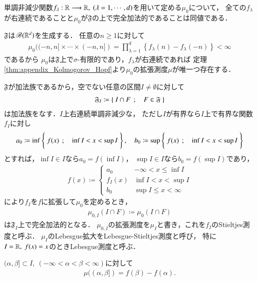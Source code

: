 	\begin{screen}
		\begin{thm}[右連続性と完全加法性]
			単調非減少関数$f_\lambda:\R \longrightarrow \R,\ (\lambda=1,\cdots,d)$を用いて定める$\mu_0$について，
			全ての$f_\lambda$が右連続であることと$\mu_0$が$\mathfrak{F}$の上で完全加法的であることは同値である．
		\end{thm}
	\end{screen}
	
	$\mathfrak{F}$は$\mathscr{B}(\mathbb{R}^d)$を生成する．
	任意の$n \geq 1$に対して
	\begin{align}
		\mu_0((-n,n] \times \cdots \times (-n,n]) 
		= \prod_{\lambda=1}^d \left\{f_\lambda(n) - f_\lambda(-n)\right\} < \infty
	\end{align}
	であるから
	$\mu_0$は$\mathfrak{F}$上で$\sigma$-有限的であり，$f_\lambda$が右連続であれば
	定理\ref{thm:appendix_Kolmogorov_Hopf}より$\mu_0$の拡張測度$\mu$が唯一つ存在する．
	
	$\mathfrak{F}$が加法族であるから，空でない任意の区間$I \neq \emptyset$に対して
	\begin{align}
		\mathfrak{F}_I \coloneqq \left\{\ I \cap F\ \, ; \quad F \in \mathfrak{F}\ \right\}
	\end{align}
	は加法族をなす．$I$上右連続単調非減少な，
	ただし$I$が有界なら$I$上で有界な関数$f_I$に対し
	\begin{align}
		a_0 \coloneqq \operatorname*{inf}_{} \left\{\ f(x)\ \, ; \quad \operatorname*{inf}_{} I < x < \operatorname*{sup}_{} I\ \right\},
		\quad b_0 \coloneqq \operatorname*{sup}_{} \left\{\ f(x)\ \, ; \quad \operatorname*{inf}_{} I < x < \operatorname*{sup}_{} I\ \right\}
	\end{align}
	とすれば，$\inf{}{I} \in I$なら$a_0 = f(\inf{}{I})$，
	$\sup{}{I} \in I$なら$b_0 = f(\sup{}{I})$であり，
	\begin{align}
		f(x) \coloneqq 
		\begin{cases}
			a_0 & -\infty < x \leq \inf{}{I} \\
			f_I(x) & \inf{}{I} < x < \sup{}{I} \\
			b_0 & \sup{}{I} \leq x < \infty
		\end{cases}
	\end{align}
	により$f_I$を$f$に拡張して$\mu_0$を定めるとき，
	\begin{align}
		\mu_{0,I}(I \cap F) \coloneqq \mu_0(I \cap F)
	\end{align}
	は$\mathfrak{F}_I$上で完全加法的となる．
	$\mu_{0,I}$の拡張測度を$\mu_I$と書き，これを$f_I$のStieltjes測度と呼ぶ．
	$\mu_I$のLebesgue拡大をLebesgue-Stieltjes測度と呼び，
	特に$I = \mathbb{R},\ f(x) = x$のときLebesgue測度と呼ぶ．
	
	\begin{screen}
		\begin{thm}[左半開区間のStiletjes測度]
			$(\alpha,\beta] \subset I,\ (-\infty < \alpha < \beta < \infty)$に対して
			\begin{align}
				\mu((\alpha,\beta]) = f(\beta) - f(\alpha).
			\end{align}
		\end{thm}
	\end{screen}
	
